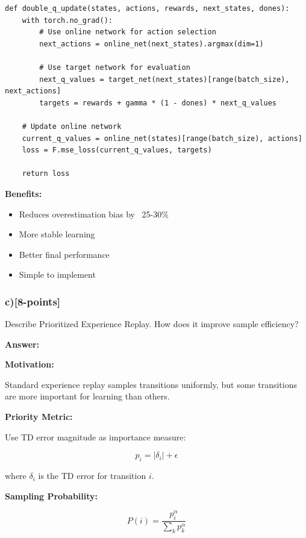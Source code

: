 \documentclass[12pt]{article}
\begin{document}
{{\begin{verbatim}
def double_q_update(states, actions, rewards, next_states, dones):
    with torch.no_grad():
        # Use online network for action selection
        next_actions = online_net(next_states).argmax(dim=1)
        
        # Use target network for evaluation
        next_q_values = target_net(next_states)[range(batch_size), next_actions]
        targets = rewards + gamma * (1 - dones) * next_q_values
    
    # Update online network
    current_q_values = online_net(states)[range(batch_size), actions]
    loss = F.mse_loss(current_q_values, targets)
    
    return loss
\end{verbatim}

\textbf{Benefits:}
\begin{itemize}
\item Reduces overestimation bias by ~25-30\%
\item More stable learning
\item Better final performance
\item Simple to implement
\end{itemize}

\subsubsection{c)[8-points]} Describe Prioritized Experience Replay. How does it improve sample efficiency?

\textbf{Answer:}

\textbf{Motivation:}

Standard experience replay samples transitions uniformly, but some transitions are more important for learning than others.

\textbf{Priority Metric:}

Use TD error magnitude as importance measure:

\begin{equation}
p_i = |\delta_i| + \epsilon
\end{equation}

where $\delta_i$ is the TD error for transition $i$.

\textbf{Sampling Probability:}

\begin{equation}
P(i) = \frac{p_i^\alpha}{\sum_k p_k^\alpha}
\end{equation}

}}
\end{document}
